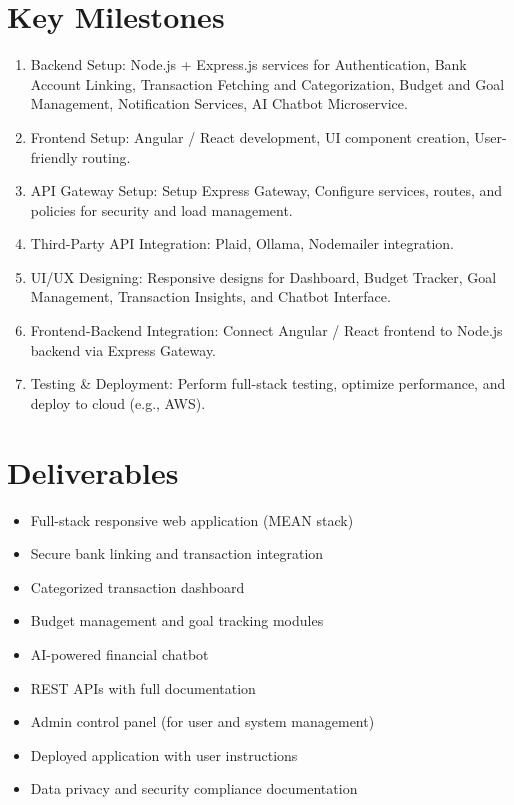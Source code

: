 \documentclass{article}
\begin{document}
\section{Key Milestones}
\begin{enumerate}
    \item Backend Setup: Node.js + Express.js services for Authentication, Bank Account Linking, Transaction Fetching and Categorization, Budget and Goal Management, Notification Services, AI Chatbot Microservice.
    \item Frontend Setup: Angular / React development, UI component creation, User-friendly routing.
    \item API Gateway Setup: Setup Express Gateway, Configure services, routes, and policies for security and load management.
    \item Third-Party API Integration: Plaid, Ollama, Nodemailer integration.
    \item UI/UX Designing: Responsive designs for Dashboard, Budget Tracker, Goal Management, Transaction Insights, and Chatbot Interface.
    \item Frontend-Backend Integration: Connect Angular / React frontend to Node.js backend via Express Gateway.
    \item Testing \& Deployment: Perform full-stack testing, optimize performance, and deploy to cloud (e.g., AWS).
\end{enumerate}

\section{Deliverables}
\begin{itemize}
    \item Full-stack responsive web application (MEAN stack)
    \item Secure bank linking and transaction integration
    \item Categorized transaction dashboard
    \item Budget management and goal tracking modules
    \item AI-powered financial chatbot
    \item REST APIs with full documentation
    \item Admin control panel (for user and system management)
    \item Deployed application with user instructions
    \item Data privacy and security compliance documentation
\end{itemize}
\end{document}
